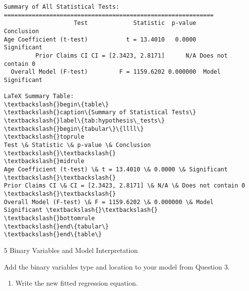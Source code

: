 \documentclass[8pt, twocolumn]{extarticle}
\providecommand{\tightlist}{%
      \setlength{\itemsep}{0pt}\setlength{\parskip}{0pt}}
\begin{document}
    \begin{center}
    \end{center}
    { \hspace*{\fill} \\}
    
    \begin{Verbatim}[commandchars=\\\{\}]


Summary of All Statistical Tests:
============================================================
                    Test             Statistic  p-value         Conclusion
Age Coefficient (t-test)           t = 13.4010   0.0000        Significant
         Prior Claims CI CI = [2.3423, 2.8171]      N/A Does not contain 0
  Overall Model (F-test)         F = 1159.6202 0.000000  Model Significant

LaTeX Summary Table:
\textbackslash{}begin\{table\}
\textbackslash{}caption\{Summary of Statistical Tests\}
\textbackslash{}label\{tab:hypothesis\_tests\}
\textbackslash{}begin\{tabular\}\{llll\}
\textbackslash{}toprule
Test \& Statistic \& p-value \& Conclusion \textbackslash{}\textbackslash{}
\textbackslash{}midrule
Age Coefficient (t-test) \& t = 13.4010 \& 0.0000 \& Significant \textbackslash{}\textbackslash{}
Prior Claims CI \& CI = [2.3423, 2.8171] \& N/A \& Does not contain 0 \textbackslash{}\textbackslash{}
Overall Model (F-test) \& F = 1159.6202 \& 0.000000 \& Model Significant \textbackslash{}\textbackslash{}
\textbackslash{}bottomrule
\textbackslash{}end\{tabular\}
\textbackslash{}end\{table\}

    \end{Verbatim}

    5 Binary Variables and Model Interpretation

Add the binary variables type and location to your model from Question
3.

    \begin{enumerate}
\def\labelenumi{(\alph{enumi})}
\tightlist
\item
  Write the new fitted regression equation.
\end{enumerate}
\end{document}
